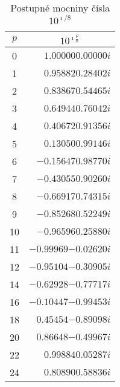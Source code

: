     \begin{table}[ht!]
      \centering
      \renewcommand{\arraystretch}{1.2}
      \begin{tabular}{cr}
        \toprule
        \(p\)        & \multicolumn{1}{c}{\(10^{\imath \frac{p}{8}}\)}  \\ \hline
        0            & \(\num{+1.00000+0.00000i}\)                          \\
        1            & \(\num{+0.95882+0.28402i}\)                          \\
        2            & \(\num{+0.83867+0.54465i}\)                          \\
        3            & \(\num{+0.64944+0.76042i}\)                          \\
        4            & \(\num{+0.40672+0.91356i}\)                          \\
        5            & \(\num{+0.13050+0.99146i}\)                          \\
        6            & \(\num{-0.15647+0.98770i}\)                          \\
        7            & \(\num{-0.43055+0.90260i}\)                          \\
        8            & \(\num{-0.66917+0.74315i}\)                          \\
        9            & \(\num{-0.85268+0.52249i}\)                          \\
        10           & \(\num{-0.96596+0.25880i}\)                          \\
        11           & \(\num{-0.99969-0.02620i}\)                          \\
        12           & \(\num{-0.95104-0.30905i}\)                          \\
        14           & \(\num{-0.62928-0.77717i}\)                          \\
        16           & \(\num{-0.10447-0.99453i}\)                          \\
        18           & \(\num{+0.45454-0.89098i}\)                          \\
        20           & \(\num{+0.86648-0.49967i}\)                          \\
        22           & \(\num{+0.99884+0.05287i}\)                          \\
        24           & \(\num{+0.80890+0.58836i}\)                          \\ \bottomrule
      \end{tabular}
      \caption{Postupné mocniny čísla \(10^{\imath/8}\)}
      \label{fyz:tab013}
    \end{table}

